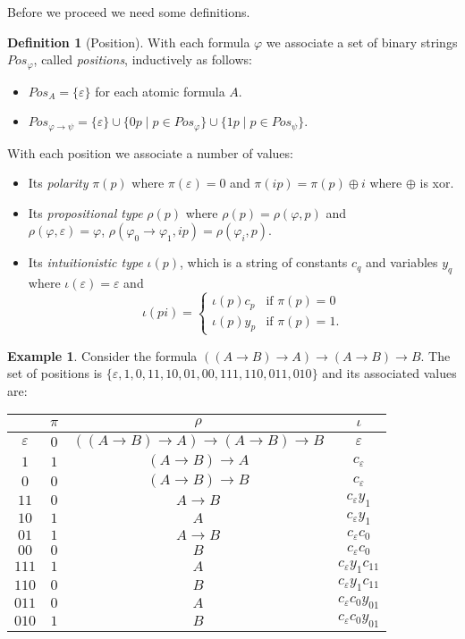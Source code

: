 \documentclass[11pt]{article}
\theoremstyle{definition}
\theoremstyle{definition}
\theoremstyle{definition}
\theoremstyle{definition}
\theoremstyle{definition}
\newtheorem{definition}[theorem]{Definition}
\theoremstyle{definition}
\newtheorem{example}[theorem]{Example}
\theoremstyle{definition}
\newcommand{\pos}{\mathit{Pos}}
\begin{document}
	Before we proceed we need some definitions.
	\begin{definition}[Position]\label{def:position}
		With each formula $\varphi$ we associate a set of binary strings $\pos_\varphi$, called \emph{positions}, inductively as follows:
		\begin{itemize}
			\item $\pos_A = \{\varepsilon\}$ for each atomic formula $A$.
			\item $\pos_{\varphi\to\psi} = \{\varepsilon\}\cup\{0p\mid p\in\pos_\varphi\}\cup\{1p\mid p\in\pos_\psi\}$.
		\end{itemize}
		With each position we associate a number of values:
		\begin{itemize}
			\item Its \emph{polarity} $\pi(p)$ where $\pi(\varepsilon) = 0$ and $\pi(ip) = \pi(p) \oplus i$ where $\oplus$ is xor.
			\item Its \emph{propositional type} $\rho(p)$ where $\rho(p) = \rho(\varphi, p)$ and\\$\rho(\varphi, \varepsilon) = \varphi$, $\rho(\varphi_0\to\varphi_1, ip) = \rho(\varphi_i, p)$.
			\item Its \emph{intuitionistic type} $\iota(p)$, which is a string of constants $c_q$ and variables $y_q$ where $\iota(\varepsilon) = \varepsilon$ and
			\[\iota(pi) = \begin{cases}
				\iota(p)c_p & \text{if } \pi(p) = 0\\
				\iota(p)y_p & \text{if } \pi(p) = 1.
			\end{cases}\]
		\end{itemize}
	\end{definition}

	\begin{example}
		Consider the formula $((A\to B)\to A)\to(A\to B)\to B$. The set of positions is $\{\varepsilon, 1, 0, 11, 10, 01, 00, 111, 110, 011, 010\}$ and its associated values are:
		\begin{center}
		\begin{tabular}{c|c|c|c}
			&$\pi$&$\rho$&$\iota$\\\hline
			$\varepsilon$&$0$&$((A\to B)\to A)\to(A\to B)\to B$&$\varepsilon$\\
			$1$&$1$&$(A\to B)\to A$&$c_\varepsilon$\\
			$0$&$0$&$(A\to B)\to B$&$c_\varepsilon$\\
			$11$&$0$&$A\to B$&$c_\varepsilon y_1$\\
			$10$&$1$&$A$&$c_\varepsilon y_1$\\
			$01$&$1$&$A\to B$&$c_\varepsilon c_0$\\
			$00$&$0$&$B$&$c_\varepsilon c_0$\\
			$111$&$1$&$A$&$c_\varepsilon y_1c_{11}$\\
			$110$&$0$&$B$&$c_\varepsilon y_1c_{11}$\\
			$011$&$0$&$A$&$c_\varepsilon c_0y_{01}$\\
			$010$&$1$&$B$&$c_\varepsilon c_0y_{01}$
		\end{tabular}
		\end{center}
	\end{example}
\end{document}
